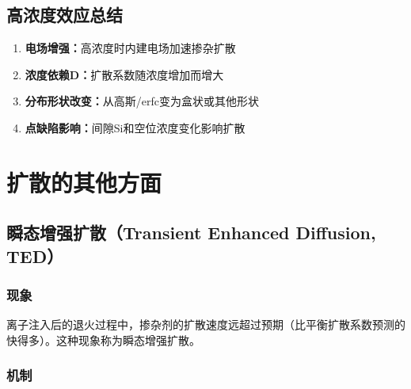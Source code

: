 \documentclass[UTF8,12pt,a4paper]{ctexart}
\begin{document}
\subsection{高浓度效应总结}

\begin{enumerate}
    \item \textbf{电场增强：}高浓度时内建电场加速掺杂扩散
    \item \textbf{浓度依赖D：}扩散系数随浓度增加而增大
    \item \textbf{分布形状改变：}从高斯/erfc变为盒状或其他形状
    \item \textbf{点缺陷影响：}间隙Si和空位浓度变化影响扩散
\end{enumerate}
\newpage
\section{扩散的其他方面}

\subsection{瞬态增强扩散（Transient Enhanced Diffusion, TED）}

\subsubsection{现象}

离子注入后的退火过程中，掺杂剂的扩散速度远超过预期（比平衡扩散系数预测的快得多）。这种现象称为瞬态增强扩散。

\subsubsection{机制}
\end{document}

